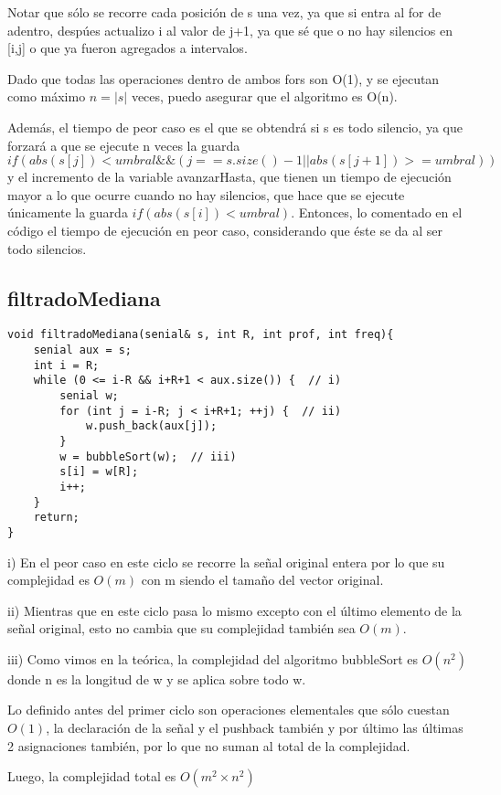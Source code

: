 \documentclass{article}
\begin{document}
Notar que sólo se recorre cada posición de s una vez, ya que si entra al for de adentro, despúes actualizo i
al valor de j+1, ya que sé que o no hay silencios en [i,j] o que ya fueron agregados a intervalos.

Dado que todas las operaciones dentro de ambos fors son O(1), y se ejecutan como máximo $n=|s|$ veces, puedo
asegurar que el algoritmo es O(n).

Además, el tiempo de peor caso es el que se obtendrá si s es todo silencio, ya que forzará a que se ejecute n
veces la guarda $if(abs(s[j]) < umbral \&\& (j == s.size()-1 || abs(s[j+1]) >= umbral))$ y el incremento de
la variable avanzarHasta, que tienen un tiempo de ejecución mayor a lo que ocurre cuando no hay silencios,
que hace que se ejecute únicamente la guarda $if(abs(s[i]) < umbral)$. Entonces, lo comentado en el código el tiempo de
ejecución en peor caso, considerando que éste se da al ser todo silencios.


\newpage
\subsection{filtradoMediana}
\begin{lstlisting}
void filtradoMediana(senial& s, int R, int prof, int freq){
    senial aux = s;
    int i = R;
    while (0 <= i-R && i+R+1 < aux.size()) {  // i)
        senial w;
        for (int j = i-R; j < i+R+1; ++j) {  // ii)
            w.push_back(aux[j]);
        }
        w = bubbleSort(w);  // iii)
        s[i] = w[R];
        i++;
    }
    return;
}
\end{lstlisting}

i) En el peor caso en este ciclo se recorre la señal original entera por lo que su complejidad es $O(m)$ con m siendo el tamaño del vector original.

ii) Mientras que en este ciclo pasa lo mismo excepto con el último elemento de la señal original, esto no cambia que su complejidad también sea $O(m)$.

iii) Como vimos en la teórica, la complejidad del algoritmo bubbleSort es $O(n^2)$ donde n es la longitud de w y se aplica sobre todo w.

Lo definido antes del primer ciclo son operaciones elementales que sólo cuestan $O(1)$, la declaración de la señal y el pushback también y por último las últimas 2 asignaciones también, por lo que no suman al total de la complejidad.

Luego, la complejidad total es $O(m^2 \times n^2)$
\end{document}
